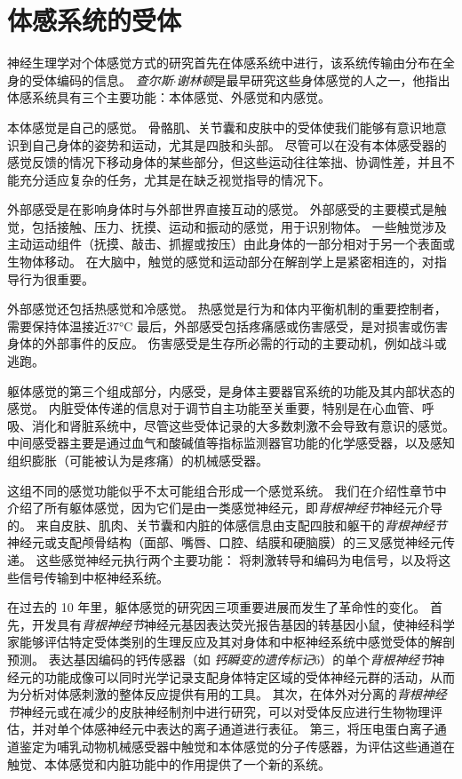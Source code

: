 \chapter{体感系统的受体} \label{chap:chap18}

神经生理学对个体感觉方式的研究首先在体感系统中进行，该系统传输由分布在全身的受体编码的信息。
\textit{查尔斯$\cdot$谢林顿}是最早研究这些身体感觉的人之一，他指出体感系统具有三个主要功能：本体感觉、外感觉和内感觉。


本体感觉是自己的感觉。
骨骼肌、关节囊和皮肤中的受体使我们能够有意识地意识到自己身体的姿势和运动，尤其是四肢和头部。
尽管可以在没有本体感受器的感觉反馈的情况下移动身体的某些部分，但这些运动往往笨拙、协调性差，并且不能充分适应复杂的任务，尤其是在缺乏视觉指导的情况下。

外部感受是在影响身体时与外部世界直接互动的感觉。
外部感受的主要模式是触觉，包括接触、压力、抚摸、运动和振动的感觉，用于识别物体。
一些触觉涉及主动运动组件（抚摸、敲击、抓握或按压）由此身体的一部分相对于另一个表面或生物体移动。
在大脑中，触觉的感觉和运动部分在解剖学上是紧密相连的，对指导行为很重要。

外部感觉还包括热感觉和冷感觉。
热感觉是行为和体内平衡机制的重要控制者，需要保持体温接近37°C
最后，外部感受包括疼痛感或伤害感受，是对损害或伤害身体的外部事件的反应。
伤害感受是生存所必需的行动的主要动机，例如战斗或逃跑。


躯体感觉的第三个组成部分，内感受，是身体主要器官系统的功能及其内部状态的感觉。
内脏受体传递的信息对于调节自主功能至关重要，特别是在心血管、呼吸、消化和肾脏系统中，尽管这些受体记录的大多数刺激不会导致有意识的感觉。
中间感受器主要是通过血气和酸碱值等指标监测器官功能的化学感受器，以及感知组织膨胀（可能被认为是疼痛）的机械感受器。


这组不同的感觉功能似乎不太可能组合形成一个感觉系统。
我们在介绍性章节中介绍了所有躯体感觉，因为它们是由一类感觉神经元，即\textit{背根神经节}神经元介导的。
来自皮肤、肌肉、关节囊和内脏的体感信息由支配四肢和躯干的\textit{背根神经节}神经元或支配颅骨结构（面部、嘴唇、口腔、结膜和硬脑膜）的三叉感觉神经元传递。
这些感觉神经元执行两个主要功能：
将刺激转导和编码为电信号，以及将这些信号传输到中枢神经系统。


在过去的 10 年里，躯体感觉的研究因三项重要进展而发生了革命性的变化。 
首先，开发具有\textit{背根神经节}神经元基因表达荧光报告基因的转基因小鼠，使神经科学家能够评估特定受体类别的生理反应及其对身体和中枢神经系统中感觉受体的解剖预测。
表达基因编码的钙传感器（如 \textit{钙瞬变的遗传标记}6）的单个\textit{背根神经节}神经元的功能成像可以同时光学记录支配身体特定区域的受体神经元群的活动，从而为分析对体感刺激的整体反应提供有用的工具。
其次，在体外对分离的\textit{背根神经节}神经元或在减少的皮肤神经制剂中进行研究，可以对受体反应进行生物物理评估，并对单个体感神经元中表达的离子通道进行表征。
第三，将压电蛋白离子通道鉴定为哺乳动物机械感受器中触觉和本体感觉的分子传感器，为评估这些通道在触觉、本体感觉和内脏功能中的作用提供了一个新的系统。


